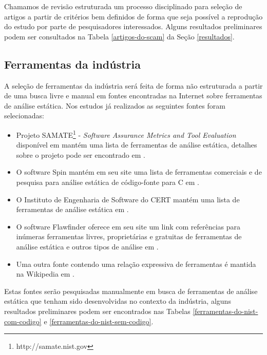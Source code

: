 \documentclass[qual, classic, a4paper]{ufbathesis}
\begin{document}
Chamamos de revisão estruturada um processo disciplinado para seleção de
artigos a partir de critérios bem definidos de forma que seja possível a
reprodução do estudo por parte de pesquisadores interessados. Alguns
resultados preliminares podem ser consultados na Tabela \ref{artigos-do-scam}
da Seção \ref{resultados}.

\subsection{Ferramentas da indústria}

A seleção de ferramentas da indústria será feita de forma não estruturada a
partir de uma busca livre e manual em fontes encontradas na Internet sobre
ferramentas de análise estática. Nos estudos já realizados as seguintes fontes
foram selecionadas:

\begin{itemize}

  \item Projeto SAMATE\footnote{http://samate.nist.gov} - {\em Software
    Assurance Metrics and Tool Evaluation} disponível em
     mantém uma lista de ferramentas de análise
    estática, detalhes sobre o projeto pode ser encontrado em
    .

  \item O software Spin mantém em seu site uma lista de ferramentas comerciais
    e de pesquisa para análise estática de código-fonte para C em
    .
    
  \item O Instituto de Engenharia de Software do CERT mantém uma lista de
    ferramentas de análise estática em .
    
  \item O software Flawfinder oferece em seu site um link com referências para
    inúmeras ferramentas livres, proprietárias e gratuitas de ferramentas de
    análise estática e outros tipos de análise em
    .

  \item Uma outra fonte contendo uma relação expressiva de ferramentas é
    mantida na Wikipedia em .

\end{itemize}

Estas fontes serão pesquisadas manualmente em busca de ferramentas de análise
estática que tenham sido desenvolvidas no contexto da indústria, alguns
resultados preliminares podem ser encontrados nas Tabelas
\ref{ferramentas-do-nist-com-codigo} e \ref{ferramentas-do-nist-sem-codigo}.
\end{document}
